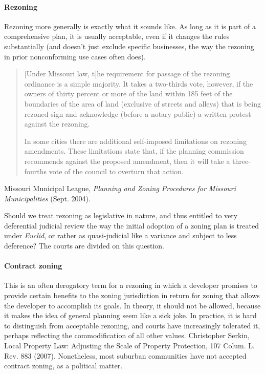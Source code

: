 \paragraph{Rezoning} Rezoning more generally is exactly what it sounds like. As
long as it is part of a comprehensive plan, it is usually acceptable, even if it
changes the rules substantially (and doesn't just exclude specific businesses,
the way the rezoning in prior nonconforming use cases often does). 

\begin{quotation}
[Under Missouri law, t]he requirement for passage of the rezoning ordinance is a
simple majority. It takes a two-thirds vote, however, if the owners of thirty
percent or more of the land within 185 feet of the boundaries of the area of
land (exclusive of streets and alleys) that is being rezoned sign and
acknowledge (before a notary public) a written protest against the rezoning.

In some cities there are additional self-imposed limitations on rezoning
amendments. These limitations state that, if the planning commission recommends
against the proposed amendment, then it will take a three-fourths vote of the
council to overturn that action.
\end{quotation}
Missouri Municipal League, \emph{Planning and Zoning Procedures for Missouri
Municipalities} (Sept. 2004).

Should we treat rezoning as legislative in nature, and thus entitled to very
deferential judicial review the way the initial adoption of a zoning plan is
treated under \textit{Euclid}, or rather as quasi-judicial like a variance and
subject to less deference? The courts are divided on this question. 

\paragraph{Contract zoning} This is an often derogatory term for a rezoning in
which a developer promises to provide certain benefits to the zoning
jurisdiction in return for zoning that allows the developer to accomplish its
goals. In theory, it should not be allowed, because it makes the idea of general
planning seem like a sick joke. In practice, it is hard to distinguish from
acceptable rezoning, and courts have increasingly tolerated it, perhaps
reflecting the commodification of all other values. Christopher Serkin, Local
Property Law: Adjusting the Scale of Property Protection, 107 Colum. L. Rev. 883
(2007). Nonetheless, most suburban communities have not accepted contract
zoning, as a political matter.


